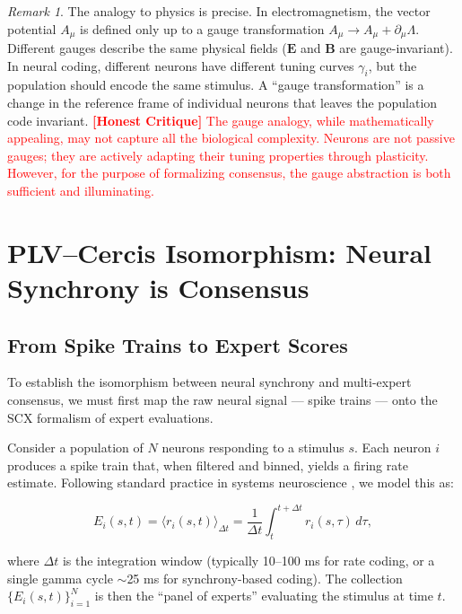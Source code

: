 \documentclass[12pt,a4paper]{article}
\theoremstyle{remark}
\newtheorem{remark}[theorem]{Remark}
\newcommand{\honestcrit}[1]{\textcolor{red}{\textbf{[Honest Critique]} #1}}
\begin{document}
\begin{remark}
The analogy to physics is precise. In electromagnetism, the vector potential
$A_\mu$ is defined only up to a gauge transformation $A_\mu \to A_\mu +
\partial_\mu \Lambda$. Different gauges describe the same physical fields
($\mathbf{E}$ and $\mathbf{B}$ are gauge-invariant). In neural coding,
different neurons have different tuning curves $\gamma_i$, but the population
should encode the same stimulus. A ``gauge transformation'' is a change in the
reference frame of individual neurons that leaves the population code invariant.
\honestcrit{The gauge analogy, while mathematically appealing, may not capture
all the biological complexity. Neurons are not passive gauges; they are
actively adapting their tuning properties through plasticity. However, for the
purpose of formalizing consensus, the gauge abstraction is both sufficient and
illuminating.}
\end{remark}

\section{PLV–Cercis Isomorphism: Neural Synchrony is Consensus}
\label{sec:plv-cercis}

\subsection{From Spike Trains to Expert Scores}

To establish the isomorphism between neural synchrony and multi-expert
consensus, we must first map the raw neural signal --- spike trains --- onto
the SCX formalism of expert evaluations.

Consider a population of $N$ neurons responding to a stimulus $s$. Each
neuron $i$ produces a spike train that, when filtered and binned, yields a
firing rate estimate. Following standard practice in systems neuroscience
\cite{dayan2005theoretical}, we model this as:

\begin{equation}\label{eq:neuron-expert-map}
    E_i(s, t) = \langle r_i(s, t) \rangle_{\Delta t} = \frac{1}{\Delta t} \int_{t}^{t+\Delta t} r_i(s, \tau) \, d\tau,
\end{equation}

where $\Delta t$ is the integration window (typically 10--100 ms for rate
coding, or a single gamma cycle $\sim$25 ms for synchrony-based coding).
The collection $\{E_i(s, t)\}_{i=1}^{N}$ is then the ``panel of experts''
evaluating the stimulus at time $t$.
\end{document}
